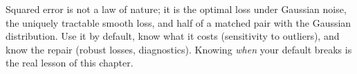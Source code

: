\begin{keybox}
Squared error is not a law of nature; it is the optimal loss under Gaussian noise, the uniquely tractable smooth loss, and half of a matched pair with the Gaussian distribution. Use it by default, know what it costs (sensitivity to outliers), and know the repair (robust losses, diagnostics). Knowing \emph{when} your default breaks is the real lesson of this chapter.
\end{keybox}
